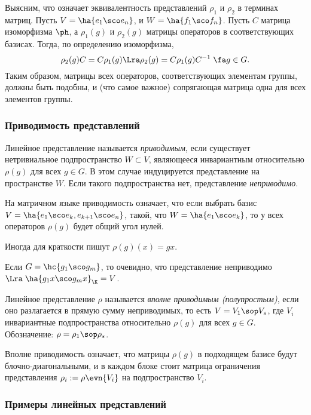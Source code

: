 \documentclass[a4paper]{article}
\begin{document}
Выясним, что означает эквивалентность представлений $\rho_1$ и $\rho_2$ в терминах матриц. Пусть
$V=\ha{e_1 \sco e_n}$, и $W=\ha{f_1 \sco f_n}$. Пусть $C$ матрица изоморфизма $\ph$, а $\rho_1(g)$ и $\rho_2(g)$
матрицы операторов в соответствующих базисах. Тогда, по определению изоморфизма,
$$\rho_2(g)C=C\rho_1(g) \Lra \rho_2(g)=C\rho_1(g)C^{-1} \; \fa g \in G.$$
Таким образом, матрицы всех операторов, соответствующих элементам группы, должны быть подобны, и (что  самое
важное) сопрягающая матрица одна для всех элементов группы.

\subsubsection{Приводимость представлений}

\begin{df}
Линейное представление называется \emph{приводимым}, если существует нетривиальное подпространство  $W
\subset V$, являющееся инвариантным относительно $\rho(g)$ для всех $g \in G$. В этом случае индуцируется
представление на пространстве $W$. Если такого подпространства нет, представление \emph{неприводимо}.
\end{df}

На матричном языке приводимость означает, что если выбрать базис $V=\ha{e_1 \sco e_k, e_{k+1} \sco e_n}$, такой, что
$W=\ha{e_1 \sco e_k}$, то у всех операторов $\rho(g)$ будет общий угол нулей.

\begin{note}
Иногда для краткости пишут $\rho(g)(x)=gx$.
\end{note}

Если $G=\hc{g_1 \sco g_m}$, то очевидно, что представление неприводимо $\Lra \; \ha{g_1x \sco g_m x}_\K = V$.

\begin{df}
Линейное представление $\rho$ называется \emph{вполне приводимым (полупростым)}, если оно разлагается в
прямую сумму неприводимых, то есть $V = V_1 \sop V_s$, где $V_i$ инвариантные подпространства
относительно $\rho(g)$ для всех $g \in G$. Обозначение: $\rho = \rho_1 \sop \rho_s$.
\end{df}

Вполне приводимость означает, что матрицы $\rho(g)$ в подходящем базисе будут блочно-диагональными, и в
каждом блоке стоит матрица ограничения представления $\rho_i := \rho\evn {V_i}$ на подпространство $V_i$.

\subsubsection{Примеры линейных представлений}
\end{document}
